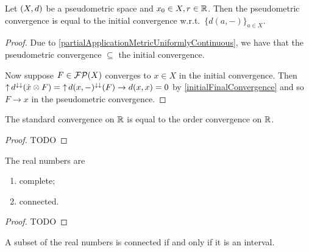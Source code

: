 \begin{corollary} \label{metricConvergenceInitial}
Let $\sSet{X,d}$ be a pseudometric space and $x_0\in X, r\in \mathbb{R}$. Then the pseudometric convergence is equal to the initial convergence w.r.t.\ $\{d(a,-)\}_{a\in X}$.
\end{corollary}
\begin{proof}
Due to \ref{partialApplicationMetricUniformlyContinuous}, we have that the pseudometric convergence $\subseteq$ the initial convergence.

Now suppose $F\in \operatorname{\mathcal{FP}}(X)$ converges to $x\in X$ in the initial convergence. Then $\operatorname{\uparrow} d^{\downarrow\downarrow}(\dot{x}\otimes F) = \operatorname{\uparrow} d(x,-)^{\downarrow\downarrow}(F) \to d(x,x) = 0$ by \ref{initialFinalConvergence} and so $F\to x$ in the pseudometric convergence.
\end{proof}


\begin{proposition} \label{realConvergenceOrderConvergence}
The standard convergence on $\mathbb{R}$ is equal to the order convergence on $\mathbb{R}$.
\end{proposition}
\begin{proof}
TODO
\end{proof}

\begin{proposition} \label{propertiesRealNumbers}
The real numbers are
\begin{enumerate}
\item complete;
\item connected.
\end{enumerate}
\end{proposition}
\begin{proof}
TODO
\end{proof}
\begin{lemma} \label{connectedSubsetReals}
A subset of the real numbers is connected \textup{if and only if} it is an interval.
\end{lemma}

